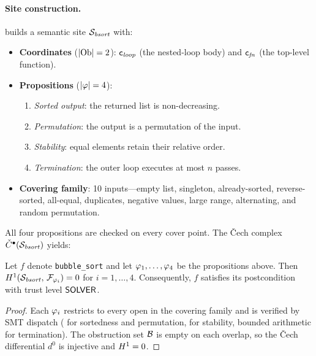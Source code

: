 \paragraph{Site construction.}
\JuGeo{} builds a semantic site $\mathcal{S}_{\mathit{bsort}}$ with:
\begin{itemize}[nosep]
  \item \textbf{Coordinates} ($|\mathrm{Ob}| = 2$):
    $\mathsf{c}_{\mathit{loop}}$ (the nested-loop body) and
    $\mathsf{c}_{\mathit{fn}}$ (the top-level function).
  \item \textbf{Propositions} ($|\varphi| = 4$):
    \begin{enumerate}[nosep,label=(\roman*)]
      \item \emph{Sorted output}: the returned list is non-decreasing.
      \item \emph{Permutation}: the output is a permutation of the input.
      \item \emph{Stability}: equal elements retain their relative order.
      \item \emph{Termination}: the outer loop executes at most $n$ passes.
    \end{enumerate}
  \item \textbf{Covering family}: 10 inputs---empty list, singleton,
    already-sorted, reverse-sorted, all-equal, duplicates, negative
    values, large range, alternating, and random permutation.
\end{itemize}

All four propositions are checked on every cover point.  The \v{C}ech
complex $\check{C}^{\bullet}(\mathcal{S}_{\mathit{bsort}})$ yields:

\begin{theorem}\label{thm:bubblesort}
Let $f$ denote \texttt{bubble\_sort} and let $\varphi_1,\ldots,\varphi_4$
be the propositions above.  Then
$H^{1}(\mathcal{S}_{\mathit{bsort}},\,\mathcal{F}_{\varphi_i}) = 0$
for $i = 1,\ldots,4$.  Consequently, $f$ satisfies its
postcondition with trust level $\mathsf{SOLVER}$.
\end{theorem}

\begin{proof}
Each $\varphi_i$ restricts to every open in the covering family and
is verified by SMT dispatch (\QFLIA{} for sortedness and permutation,
\QFUF{} for stability, bounded arithmetic for termination).  The
obstruction set $\mathcal{B}$ is empty on each overlap, so the
\v{C}ech differential $d^0$ is injective and $H^{1} = 0$.
\end{proof}


